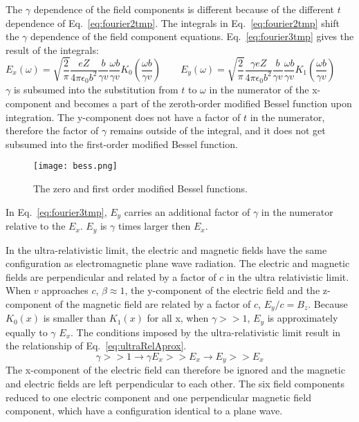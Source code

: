    The $\gamma$ dependence of the field components is different because of the
      different $t$ dependence of Eq.~\ref{eq:fourier2tmp}.
    The integrals in Eq.~\ref{eq:fourier2tmp} shift the $\gamma$ dependence of 
      the field component equations.
    Eq.~\ref{eq:fourier3tmp} gives the result of the integrals:
    \begin{equation} \label{eq:fourier3tmp}
        E_{x}(\omega)=\sqrt{\frac{2}{\pi}}\frac{eZ}{4\pi\epsilon_{0}b^{2}}
	 \frac{b}{\gamma v}\frac{\omega b}{\gamma v}K_{0}
	 \left(\frac{\omega b}{\gamma v}\right)\qquad
	E_{y}(\omega)=\sqrt{\frac{2}{\pi}}\frac{\gamma eZ}{4\pi\epsilon_{0}b^{2}}
	 \frac{b}{\gamma v}\frac{\omega b}{\gamma v}K_{1}
	 \left(\frac{\omega b}{\gamma v}\right)\qquad
    \end{equation}
    $\gamma$ is subsumed into the substitution from $t$ to $\omega$ in the 
      numerator of the x-component and becomes a part of the zeroth-order 
      modified Bessel function upon integration.
    The y-component does not have a factor of $t$ in the numerator, therefore 
      the factor of $\gamma$ remains outside of the integral, and it does not 
      get subsumed into the first-order modified Bessel function.
    \begin{wrapfigure}{r}{0.5\textwidth}
      \begin{center}
        \texttt{[image: bess.png]}
      \end{center}
      \caption{\label{fig:bess} The zero and first order modified Bessel functions. }
    \end{wrapfigure}
    In Eq.~\ref{eq:fourier3tmp}, $E_{y}$ carries an additional factor of 
      $\gamma$ in the numerator relative to the $E_{x}$.
    $E_{y}$ is $\gamma$ times larger then $E_{x}$.

    In the ultra-relativistic limit, the electric and magnetic fields have the 
      same configuration as electromagnetic plane wave radiation. 
    The electric and magnetic fields are perpendicular and related by a factor
      of $c$ in the ultra relativistic limit.
    When $v$ approaches $c$, $\beta \approx 1$, the y-component of the 
      electric field and the z-component of the magnetic field are related by 
      a factor of $c$, $E_{y}/c=B_{z}$.
    Because $K_{0}(x)$ is smaller than $K_{1}(x)$ for all x, when $\gamma >> 1$, 
      $E_{y}$ is approximately equally to $\gamma$ $E_{x}$. 
    The conditions imposed by the ultra-relativistic limit result in the 
      relationship of Eq.~\ref{eq:ultraRelAprox}.
    \begin{equation} \label{eq:ultraRelAprox}
      \gamma >> 1 \rightarrow \gamma E_{x}>>E_{x} \rightarrow E_{y} >> E_{x}
    \end{equation}
    The x-component of the electric field can therefore be ignored and 
      the magnetic and electric fields are left perpendicular to each other.
    The six field components reduced to one electric component and one 
      perpendicular magnetic field component, which have a configuration 
      identical to a plane wave. 

